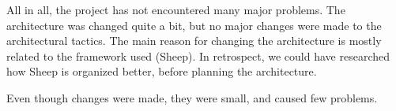 All in all, the project has not encountered many major problems. The architecture was changed quite a bit, but no major changes were made to the architectural tactics. The main reason for changing the architecture is mostly related to the framework used (Sheep). In retrospect, we could have researched how Sheep is organized better, before planning the architecture.

Even though changes were made, they were small, and caused few problems.
